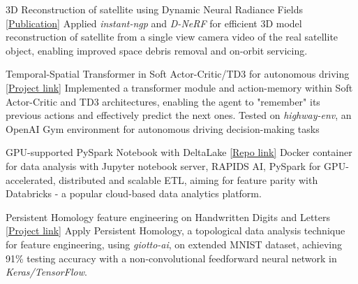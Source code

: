 \vspace{-5mm}
\vspace{-2mm}

\begin{cventries}

	\cventry
	{}
	{3D Reconstruction of satellite using Dynamic Neural Radiance Fields}
	{\href{https://arxiv.org/abs/2301.09060}{[Publication]}}
	{}
	{Applied \emph{instant-ngp} and \emph{D-NeRF} for efficient 3D model reconstruction of satellite from a single view camera video of the real satellite object, enabling improved space debris removal and on-orbit servicing.}

	\cventry
	{}
	{Temporal-Spatial Transformer in Soft Actor-Critic/TD3 for autonomous driving}
	{\href{https://github.com/sesem738/Lavenza}{[Project link]}}
	{}
	{Implemented a transformer module and action-memory within Soft Actor-Critic and TD3 architectures, enabling the agent to "remember" its previous actions and effectively predict the next ones. Tested on \emph{highway-env}, an OpenAI Gym environment for autonomous driving decision-making tasks}

	\cventry
	{}
	{GPU-supported PySpark Notebook with DeltaLake}
	{\href{https://github.com/n0k0m3/pyspark-notebook-deltalake-docker}{[Repo link]}}
	{}
	{Docker container for data analysis with Jupyter notebook server, RAPIDS AI, PySpark for GPU-accelerated, distributed and scalable ETL, aiming for feature parity with Databricks - a popular cloud-based data analytics platform.}

	\cventry
	{}
	{Persistent Homology feature engineering on Handwritten Digits and Letters}
	{\href{https://colab.research.google.com/drive/18z161k3diYO6sNVBfiKH8uGqbrekxMPN?usp=sharing}{[Project link]}}
	{}
	{Apply Persistent Homology, a topological data analysis technique for feature engineering, using \emph{giotto-ai}, on extended MNIST dataset, achieving 91\% testing accuracy with a non-convolutional feedforward neural network in \emph{Keras/TensorFlow}.}




\end{cventries}
